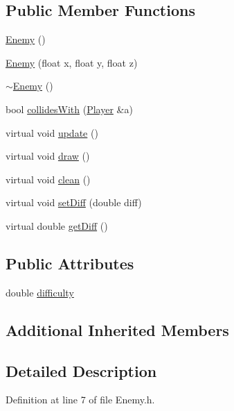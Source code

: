 \subsection*{Public Member Functions}
\begin{DoxyCompactItemize}
\item 
\hyperlink{classEnemy_a94f30d348b6d2840fd71675472ba38dd}{Enemy} ()
\item 
\hyperlink{classEnemy_a53db9778244c976f711f25463982cad2}{Enemy} (float x, float y, float z)
\item 
\hyperlink{classEnemy_ac0eec4755e28c02688065f9657150ac3}{$\sim$\-Enemy} ()
\item 
bool \hyperlink{classEnemy_a0fd40f508e31be597eab5840df775749}{collides\-With} (\hyperlink{classPlayer}{Player} \&a)
\item 
virtual void \hyperlink{classEnemy_ad55ee71b5a8c23fbd00b3c368b90cc64}{update} ()
\item 
virtual void \hyperlink{classEnemy_a7dcf45915f6288ef9264ec60af621b6c}{draw} ()
\item 
virtual void \hyperlink{classEnemy_a12e87c9cb633fed1d846a61cfe7f91c7}{clean} ()
\item 
virtual void \hyperlink{classEnemy_a9a0377be732b07f337206077c1f1acf7}{set\-Diff} (double diff)
\item 
virtual double \hyperlink{classEnemy_ac9934ae427de817275472e64cf617c39}{get\-Diff} ()
\end{DoxyCompactItemize}
\subsection*{Public Attributes}
\begin{DoxyCompactItemize}
\item 
double \hyperlink{classEnemy_acca04a63f878d07a3db3285f5f8fbbed}{difficulty}
\end{DoxyCompactItemize}
\subsection*{Additional Inherited Members}


\subsection{Detailed Description}


Definition at line 7 of file Enemy.\-h.



